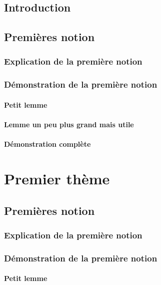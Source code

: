 \documentclass[a4paper,cours]{../texmf/tex/latex/insa/insa}
\begin{document}
	\maketitle
	\tableofcontents 
	
	\chapter{Introduction}
		\lipsum[1-10]
	\chapter{Premières notion}
		\lipsum[1-2]
		\section{Explication de la première notion}
			\lipsum[1-5]
		\section{Démonstration de la première notion}
			\subsection{Petit lemme}
				\lipsum[1-2]
			\subsection{Lemme un peu plus grand mais utile}
				\lipsum[1-4]
			\subsection{Démonstration complète}
				\lipsum[1-5]
	
	\part{Premier thème}
		\chapter{Premières notion}
			\lipsum[1-2]
			\section{Explication de la première notion}
				\lipsum[1-5]
			\section{Démonstration de la première notion}
				\subsection{Petit lemme}
					\lipsum[1-2]
\end{document}
